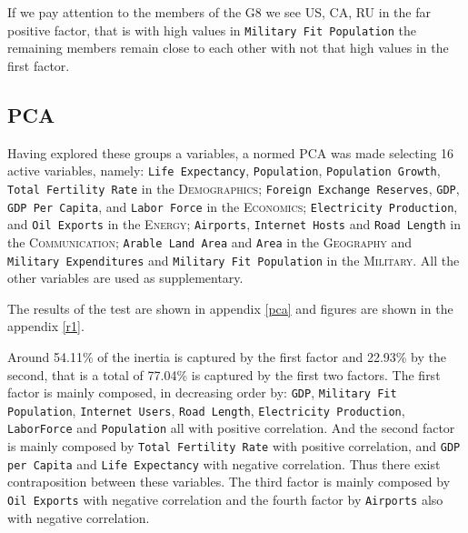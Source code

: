 \documentclass[a4paper,10pt,twocolumn]{article}
\begin{document}
If we pay attention to the members of the \textsc{G8} we see \textsc{US, CA, RU} in the far positive factor, that is with high values in \texttt{Military Fit Population}  the remaining members remain close to each other with not that high values in the first factor.

\subsection{PCA}

Having explored these groups a variables, a normed PCA was made selecting 16 active variables, namely: \texttt{Life Expectancy}, \texttt{Population}, \texttt{Population Growth}, \texttt{Total Fertility Rate} in the \textsc{Demographics};  \texttt{Foreign Exchange Reserves}, \texttt{GDP}, \texttt{GDP Per Capita}, and \texttt{Labor Force} in the \textsc{Economics}; \texttt{Electricity Production}, and \texttt{Oil Exports} in the \textsc{Energy}; \texttt{Airports}, \texttt{Internet Hosts} and \texttt{Road Length} in the \textsc{Communication}; \texttt{Arable Land Area} and \texttt{Area} in the \textsc{Geography} and \texttt{Military Expenditures} and \texttt{Military Fit Population} in the \textsc{Military}. All the other variables are used as supplementary.  

The results of the test are shown in appendix \ref{pca} and figures are shown in the appendix \ref{r1}. 

Around 54.11\% of the inertia is captured by the first factor and 22.93\% by the second, that is a total of 77.04\% is captured by the first two factors. The first factor is mainly composed, in decreasing order by: \texttt{GDP}, \texttt{Military Fit Population}, \texttt{Internet Users}, \texttt{Road Length}, \texttt{Electricity Production}, \texttt{LaborForce} and \texttt{Population} all with positive correlation. And the second factor is mainly composed by \texttt{Total Fertility Rate} with positive correlation, and \texttt{GDP per Capita} and \texttt{Life Expectancy} with negative correlation. Thus there exist contraposition between these variables. 
The third factor is mainly composed by \texttt{Oil Exports} with negative correlation and the fourth factor by \texttt{Airports} also with negative correlation. 
\end{document}
